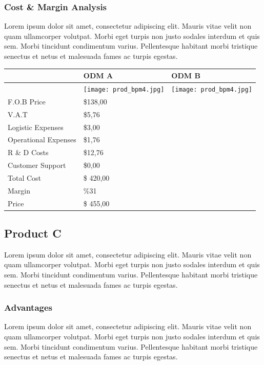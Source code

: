\documentclass[11pt,titlepage]{article}
\begin{document}
\subsubsection{Cost \& Margin Analysis}
Lorem ipsum dolor sit amet, consectetur adipiscing elit. Mauris vitae velit 
non quam ullamcorper volutpat. Morbi eget turpis non justo sodales interdum 
et quis sem. Morbi tincidunt condimentum varius. Pellentesque habitant morbi 
tristique senectus et netus et malesuada fames ac turpis egestas.\newline
\begin{tabular}{ | l | l | l | }\hline
  & ODM A & ODM B \\ \hline
  & \texttt{[image: prod\_bpm4.jpg]} & 
  \texttt{[image: prod\_bpm4.jpg]} \\ \hline
  F.O.B Price & \$138,00 &  \\ \hline
  V.A.T & \$5,76 &  \\ \hline
  Logistic Expenses & \$3,00 & \\ \hline
  Operational Expenses & \$1,76 & \\ \hline
  R \& D Costs & \$12,76 &  \\ \hline
  Customer Support & \$0,00 &  \\ \hline
  Total Cost & \$ 420,00 &  \\ \hline
  Margin & \%31 &  \\ \hline
  Price & \$ 455,00 &  \\ \hline
\end{tabular}
\pagebreak

\subsection{Product C}
Lorem ipsum dolor sit amet, consectetur adipiscing elit. Mauris vitae velit 
non quam ullamcorper volutpat. Morbi eget turpis non justo sodales interdum 
et quis sem. Morbi tincidunt condimentum varius. Pellentesque habitant morbi 
tristique senectus et netus et malesuada fames ac turpis egestas.\newline
\subsubsection{Advantages}
Lorem ipsum dolor sit amet, consectetur adipiscing elit. Mauris vitae velit 
non quam ullamcorper volutpat. Morbi eget turpis non justo sodales interdum 
et quis sem. Morbi tincidunt condimentum varius. Pellentesque habitant morbi 
tristique senectus et netus et malesuada fames ac turpis egestas.\newline
\end{document}
